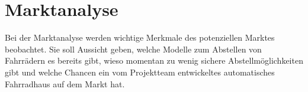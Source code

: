 \section{Marktanalyse}
Bei der Marktanalyse werden wichtige Merkmale des potenziellen Marktes beobachtet. Sie soll Aussicht geben, welche Modelle zum Abstellen von Fahrrädern es bereits gibt, wieso momentan zu wenig sichere Abstellmöglichkeiten gibt und welche Chancen ein vom Projektteam entwickeltes automatisches Fahrradhaus auf dem Markt hat.













\clearpage
